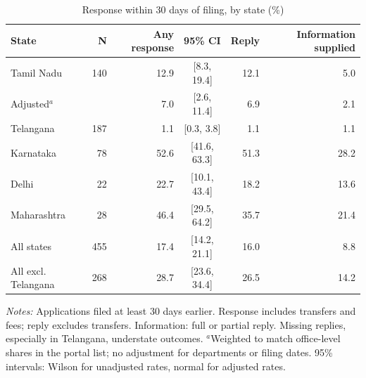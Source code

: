 \begin{table}[!htbp]
\centering
\caption{Response within 30 days of filing, by state (\%)}
\label{tab:tab_response_state}
\small
\begin{threeparttable}
\begin{tabular}{lrrcrr}
\toprule
State & N & Any response & 95\% CI & Reply & Information supplied \\
\midrule
Tamil Nadu & 140 & 12.9 & [8.3, 19.4] & 12.1 & 5.0 \\
\quad Adjusted$^a$ &  & 7.0 & [2.6, 11.4] & 6.9 & 2.1 \\
Telangana & 187 & 1.1 & [0.3, 3.8] & 1.1 & 1.1 \\
Karnataka & 78 & 52.6 & [41.6, 63.3] & 51.3 & 28.2 \\
Delhi & 22 & 22.7 & [10.1, 43.4] & 18.2 & 13.6 \\
Maharashtra & 28 & 46.4 & [29.5, 64.2] & 35.7 & 21.4 \\
\midrule
All states & 455 & 17.4 & [14.2, 21.1] & 16.0 & 8.8 \\
All excl. Telangana & 268 & 28.7 & [23.6, 34.4] & 26.5 & 14.2 \\
\bottomrule
\end{tabular}
\begin{tablenotes}[flushleft]\footnotesize
\item \textit{Notes:} Applications filed at least 30 days earlier. Response includes transfers and fees; reply excludes transfers. Information: full or partial reply. Missing replies, especially in Telangana, understate outcomes. $^a$Weighted to match office-level shares in the portal list; no adjustment for departments or filing dates. 95\% intervals: Wilson for unadjusted rates, normal for adjusted rates.
\end{tablenotes}
\end{threeparttable}
\end{table}
